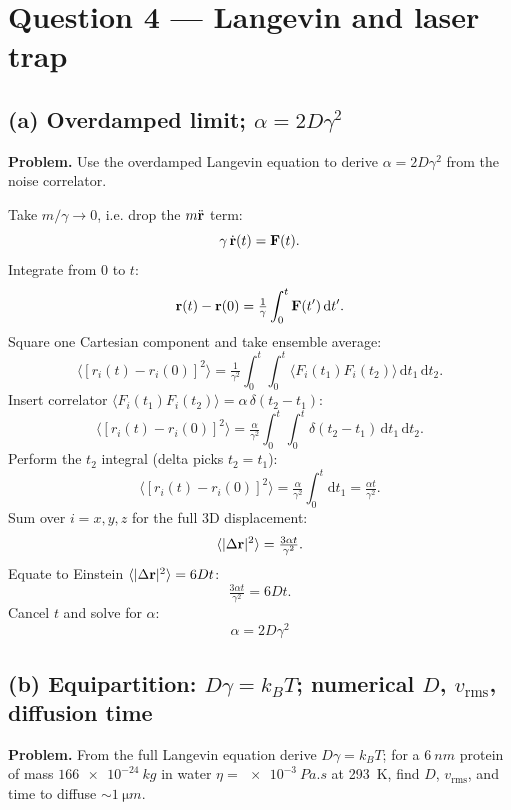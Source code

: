 \documentclass[11pt]{article}
\newcommand{\de}{\mathrm{d}}
\begin{document}
\section*{Question 4 --- Langevin and laser trap}

\subsection*{(a) Overdamped limit; $\alpha = 2D\gamma^2$}

\textbf{Problem.} Use the overdamped Langevin equation to derive $\alpha = 2D\gamma^2$ from the noise correlator.

Take $m/\gamma\to 0$, i.e. drop the $m\ddot{\vb r}$ term:
\[
\gamma\,\dot{\vb r}(t) = \vb F(t).
\]
Integrate from $0$ to $t$:
\[
\vb r(t) - \vb r(0) = \tfrac{1}{\gamma}\int_0^t \vb F(t')\,\de t'.
\]
Square one Cartesian component and take ensemble average:
\[
\langle [r_i(t)-r_i(0)]^2\rangle = \tfrac{1}{\gamma^2}\int_0^t\!\!\int_0^t \langle F_i(t_1)F_i(t_2)\rangle\,\de t_1\,\de t_2.
\]
Insert correlator $\langle F_i(t_1)F_i(t_2)\rangle = \alpha\,\delta(t_2-t_1)$:
\[
\langle [r_i(t)-r_i(0)]^2\rangle = \tfrac{\alpha}{\gamma^2}\int_0^t\!\!\int_0^t \delta(t_2-t_1)\,\de t_1\,\de t_2.
\]
Perform the $t_2$ integral (delta picks $t_2=t_1$):
\[
\langle [r_i(t)-r_i(0)]^2\rangle = \tfrac{\alpha}{\gamma^2}\int_0^t \de t_1 = \tfrac{\alpha t}{\gamma^2}.
\]
Sum over $i=x,y,z$ for the full 3D displacement:
\[
\langle |\Delta\vb r|^2\rangle = \tfrac{3\alpha t}{\gamma^2}.
\]
Equate to Einstein $\langle|\Delta\vb r|^2\rangle = 6Dt$:
\[
\tfrac{3\alpha t}{\gamma^2} = 6Dt.
\]
Cancel $t$ and solve for $\alpha$:
\[
\boxed{\;\alpha = 2D\gamma^2\;}
\]

\subsection*{(b) Equipartition: $D\gamma = k_B T$; numerical $D$, $v_\text{rms}$, diffusion time}

\textbf{Problem.} From the full Langevin equation derive $D\gamma = k_B T$; for a $\SI{6}{nm}$ protein of mass $\SI{166e-24}{kg}$ in water $\eta = \SI{e-3}{Pa.s}$ at \SI{293}{K}, find $D$, $v_\text{rms}$, and time to diffuse $\sim\SI{1}{\micro m}$.
\end{document}
